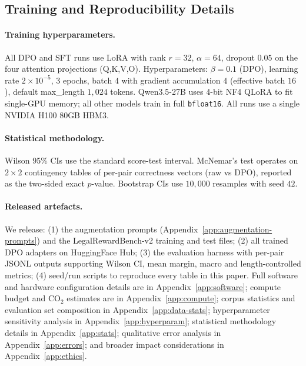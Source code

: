 \documentclass{article}
\theoremstyle{plain}
\theoremstyle{definition}
\theoremstyle{remark}
\begin{document}
\subsection{Training and Reproducibility Details}
\label{app:reproducibility}

\paragraph{Training hyperparameters.}
All DPO and SFT runs use LoRA with rank $r=32$, $\alpha=64$, dropout $0.05$ on the four attention projections (Q,K,V,O).  Hyperparameters: $\beta=0.1$ (DPO), learning rate $2\!\times\!10^{-5}$, $3$ epochs, batch $4$ with gradient accumulation $4$ (effective batch $16$), default max\_length $1{,}024$ tokens.  Qwen3.5-27B uses 4-bit NF4 QLoRA \citep{dettmers2023qlora} to fit single-GPU memory; all other models train in full \texttt{bfloat16}.  All runs use a single NVIDIA H100 80GB HBM3.

\paragraph{Statistical methodology.}
Wilson 95\% CIs use the standard score-test interval.  McNemar's test operates on $2\times2$ contingency tables of per-pair correctness vectors (raw vs DPO), reported as the two-sided exact $p$-value.  Bootstrap CIs use $10{,}000$ resamples with seed $42$.

\paragraph{Released artefacts.}
We release: (1) the augmentation prompts (Appendix~\ref{app:augmentation-prompts}) and the LegalRewardBench-v2 training and test files; (2) all trained DPO adapters on HuggingFace Hub; (3) the evaluation harness with per-pair JSONL outputs supporting Wilson CI, mean margin, macro and length-controlled metrics; (4) seed/run scripts to reproduce every table in this paper.  Full software and hardware configuration details are in Appendix~\ref{app:software}; compute budget and CO$_2$ estimates are in Appendix~\ref{app:compute}; corpus statistics and evaluation set composition in Appendix~\ref{app:data-stats}; hyperparameter sensitivity analysis in Appendix~\ref{app:hyperparam}; statistical methodology details in Appendix~\ref{app:stats}; qualitative error analysis in Appendix~\ref{app:errors}; and broader impact considerations in Appendix~\ref{app:ethics}.
\end{document}
